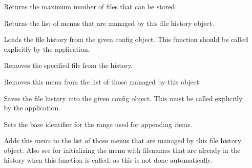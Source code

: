 \label{wxfilehistorygetmaxfiles}


Returns the maximum number of files that can be stored.


\label{wxfilehistorygetmenus}


Returns the list of menus that are managed by this file history object.




\label{wxfilehistoryload}


Loads the file history from the given config object. This function should be called explicitly by the application.




\label{wxfilehistoryfromfilefromhistory}


Removes the specified file from the history.

\label{wxfilehistoryremovemenu}


Removes this menu from the list of those managed by this object.


\label{wxfilehistorysave}


Saves the file history into the given config object. This must be called
explicitly by the application.




\label{wxfilehistorysetbaseid}


Sets the base identifier for the range used for appending items.


\label{wxfilehistoryusemenu}


Adds this menu to the list of those menus that are managed by this file history object.
Also see  for
initializing the menu with filenames that are already in the history when this
function is called, as this is not done automatically.

